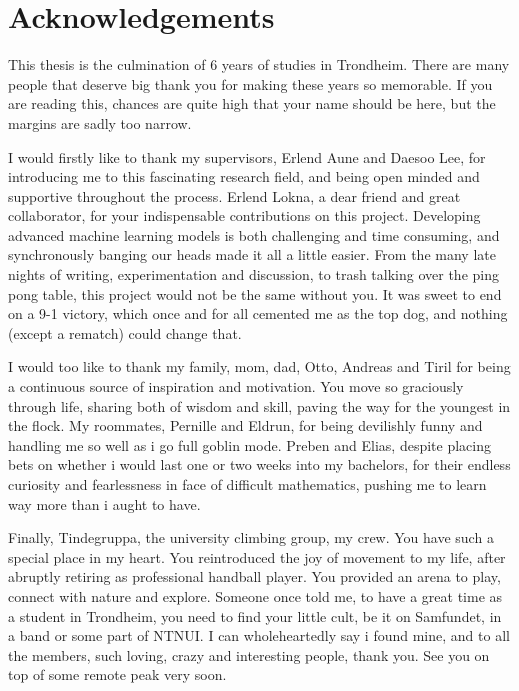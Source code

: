 \documentclass[../../thesis.tex]{subfiles}
\begin{document}

\section{Acknowledgements}
This thesis is the culmination of 6 years of studies in Trondheim. There are many people that deserve big thank you for making these years so memorable. If you are reading this, chances are quite high that your name should be here, but the margins are sadly too narrow.\newline 

I would firstly like to thank my supervisors, Erlend Aune and Daesoo Lee, for introducing me to this fascinating research field, and being open minded and supportive throughout the process. Erlend Lokna, a dear friend and great collaborator, for your indispensable contributions on this project. Developing advanced machine learning models is both challenging and time consuming, and synchronously banging our heads made it all a little easier. From the many late nights of writing, experimentation and discussion, to trash talking over the ping pong table, this project would not be the same without you. It was sweet to end on a 9-1 victory, which once and for all cemented me as the top dog, and nothing (except a rematch) could change that.\newline

I would too like to thank my family, mom, dad, Otto, Andreas and Tiril for being a continuous source of inspiration and motivation. You move so graciously through life, sharing both of wisdom and skill, paving the way for the youngest in the flock. My roommates, Pernille and Eldrun, for being devilishly funny and handling me so well as i go full goblin mode. Preben and Elias, despite placing bets on whether i would last one or two weeks into my bachelors, for their endless curiosity and fearlessness in face of difficult mathematics, pushing me to learn way more than i aught to have. \newline

Finally, Tindegruppa, the university climbing group, my crew. You have such a special place in my heart. You reintroduced the joy of movement to my life, after abruptly retiring as professional handball player. You provided an arena to play, connect with nature and explore. Someone once told me, to have a great time as a student in Trondheim, you need to find your little cult, be it on Samfundet, in a band or some part of NTNUI. I can wholeheartedly say i found mine, and to all the members, such loving, crazy and interesting people, thank you. See you on top of some remote peak very soon.
\end{document}
